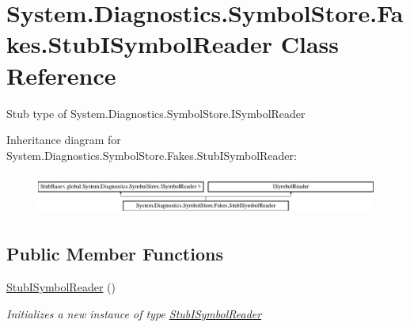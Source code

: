 \hypertarget{class_system_1_1_diagnostics_1_1_symbol_store_1_1_fakes_1_1_stub_i_symbol_reader}{\section{System.\-Diagnostics.\-Symbol\-Store.\-Fakes.\-Stub\-I\-Symbol\-Reader Class Reference}
\label{class_system_1_1_diagnostics_1_1_symbol_store_1_1_fakes_1_1_stub_i_symbol_reader}
}


Stub type of System.\-Diagnostics.\-Symbol\-Store.\-I\-Symbol\-Reader 


Inheritance diagram for System.\-Diagnostics.\-Symbol\-Store.\-Fakes.\-Stub\-I\-Symbol\-Reader\-:\begin{figure}[H]
\begin{center}
\leavevmode
\includegraphics[height=1.372549cm]{class_system_1_1_diagnostics_1_1_symbol_store_1_1_fakes_1_1_stub_i_symbol_reader}
\end{center}
\end{figure}
\subsection*{Public Member Functions}
\begin{DoxyCompactItemize}
\item 
\hyperlink{class_system_1_1_diagnostics_1_1_symbol_store_1_1_fakes_1_1_stub_i_symbol_reader_af6fb30c5764f9d7c6d61a1de7ac49dde}{Stub\-I\-Symbol\-Reader} ()
\begin{DoxyCompactList}\small\item\em Initializes a new instance of type \hyperlink{class_system_1_1_diagnostics_1_1_symbol_store_1_1_fakes_1_1_stub_i_symbol_reader}{Stub\-I\-Symbol\-Reader}\end{DoxyCompactList}\end{DoxyCompactItemize}
